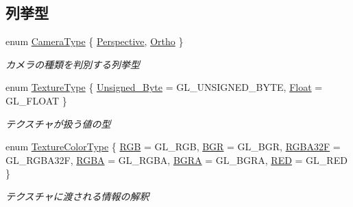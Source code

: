\subsection*{列挙型}
\begin{DoxyCompactItemize}
\item 
enum \mbox{\hyperlink{namespace_k___graphics_a46f486e742ad696f88bfbeb22f8af10f}{Camera\+Type}} \{ \mbox{\hyperlink{namespace_k___graphics_a46f486e742ad696f88bfbeb22f8af10fa67cba19780ed061de0f9933d1ee626ff}{Perspective}}, 
\mbox{\hyperlink{namespace_k___graphics_a46f486e742ad696f88bfbeb22f8af10fa79fd68c41cf0b31996c9757c8563a835}{Ortho}}
 \}
\begin{DoxyCompactList}\small\item\em カメラの種類を判別する列挙型 \end{DoxyCompactList}\item 
enum \mbox{\hyperlink{namespace_k___graphics_a218722f1def83362c6b74680b8c1c529}{Texture\+Type}} \{ \mbox{\hyperlink{namespace_k___graphics_a218722f1def83362c6b74680b8c1c529ab0721b13f0b6d56efb5b01ac5c7eb718}{Unsigned\+\_\+\+Byte}} = G\+L\+\_\+\+U\+N\+S\+I\+G\+N\+E\+D\+\_\+\+B\+Y\+TE, 
\mbox{\hyperlink{namespace_k___graphics_a218722f1def83362c6b74680b8c1c529ad9523c239c3ce59f58cc0fc4a6e8986c}{Float}} = G\+L\+\_\+\+F\+L\+O\+AT
 \}
\begin{DoxyCompactList}\small\item\em テクスチャが扱う値の型 \end{DoxyCompactList}\item 
enum \mbox{\hyperlink{namespace_k___graphics_a9654dafb2cd6eaed24a292a6f8373955}{Texture\+Color\+Type}} \{ \newline
\mbox{\hyperlink{namespace_k___graphics_a9654dafb2cd6eaed24a292a6f8373955a3f86f41090b77da22356d9010d1c0f66}{R\+GB}} = G\+L\+\_\+\+R\+GB, 
\mbox{\hyperlink{namespace_k___graphics_a9654dafb2cd6eaed24a292a6f8373955a5982abbb33a2de38202a6a14430bfbd7}{B\+GR}} = G\+L\+\_\+\+B\+GR, 
\mbox{\hyperlink{namespace_k___graphics_a9654dafb2cd6eaed24a292a6f8373955a9e29ef1d15d53abfdf21fd7cc6730d25}{R\+G\+B\+A32F}} = G\+L\+\_\+\+R\+G\+B\+A32F, 
\mbox{\hyperlink{namespace_k___graphics_a9654dafb2cd6eaed24a292a6f8373955a535fd8e72dc86d416c6a3f32923645d2}{R\+G\+BA}} = G\+L\+\_\+\+R\+G\+BA, 
\newline
\mbox{\hyperlink{namespace_k___graphics_a9654dafb2cd6eaed24a292a6f8373955ad1ca23636fb9354fdba2dac99e77f1f9}{B\+G\+RA}} = G\+L\+\_\+\+B\+G\+RA, 
\mbox{\hyperlink{namespace_k___graphics_a9654dafb2cd6eaed24a292a6f8373955a73b900220ca74e26dbc87b5baea6dd9c}{R\+ED}} = G\+L\+\_\+\+R\+ED
 \}
\begin{DoxyCompactList}\small\item\em テクスチャに渡される情報の解釈 \end{DoxyCompactList}\end{DoxyCompactItemize}


